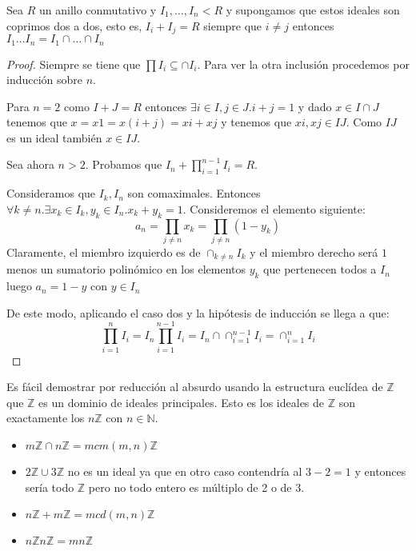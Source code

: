 \begin{proposition}
	Sea $R$ un anillo conmutativo y $I_1,\ldots,I_n < R$ y supongamos que estos ideales son coprimos dos a dos, esto es, $I_i+I_j = R$ siempre que $i \neq j$ entonces $I_1 \ldots I_n = I_1 \cap \ldots \cap I_n$
\end{proposition}
\begin{proof}
	Siempre se tiene que $\prod I_i \subseteq \cap I_i$. Para ver la otra inclusión procedemos por inducción sobre $n$. 
	
	Para $n = 2$ como $I+J = R$ entonces $\exists i \in I,j \in J.i+j = 1$ y dado $x \in I \cap J$ tenemos que $x = x1 = x(i+j) = xi + xj$ y tenemos que $xi,xj \in IJ$. Como $IJ$ es un ideal también $x \in IJ$. 
	
	Sea ahora $n > 2$. Probamos que $I_n + \prod_{i = 1}^{n-1} I_i = R$.

	Consideramos que $I_k,I_n$ son comaximales. Entonces $\forall k \neq n. \exists x_k \in I_k,y_k \in I_n. x_k+y_k = 1$. Consideremos el elemento siguiente: $$a_n =  \prod_{j \neq n} x_k = \prod_{j \neq n} (1-y_k)$$ Claramente, el miembro izquierdo es de $\cap_{k \neq n} I_k$ y el miembro derecho será $1$ menos un sumatorio polinómico en los elementos $y_k$ que pertenecen todos a $I_n$ luego $a_n = 1-y$ con $y \in I_n$
	
	De este modo, aplicando el caso dos y la hipótesis de inducción se llega a que: $$\prod_{i = 1}^{n} I_i = I_n\prod_{i = 1}^{n-1} I_i = I_n \cap \cap_{i = 1}^{n-1} I_i = \cap_{i = 1}^n I_i$$
\end{proof}

\begin{example}
	Es fácil demostrar por reducción al absurdo usando la estructura euclídea de $\mathbb{Z}$ que $\mathbb{Z}$ es un dominio de ideales principales. Esto es los ideales de $\mathbb{Z}$ son exactamente los $n\mathbb{Z}$ con $n \in \mathbb{N}$.
	
	\begin{itemize}
		\item $m\mathbb{Z} \cap n\mathbb{Z} = mcm(m,n)\mathbb{Z}$
		\item $2\mathbb{Z} \cup 3\mathbb{Z}$ no es un ideal ya que en otro caso contendría al $3-2 = 1$ y entonces sería todo $\mathbb{Z}$ pero no todo entero es múltiplo de 2 o de 3. 
		\item $n\mathbb{Z}+m\mathbb{Z} = mcd(m,n)\mathbb{Z}$
		\item $n\mathbb{Z}n\mathbb{Z} = mn\mathbb{Z}$
	\end{itemize}
\end{example}

